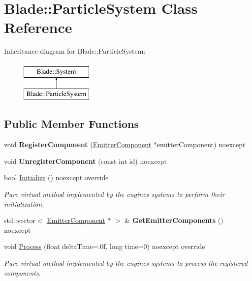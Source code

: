 \hypertarget{class_blade_1_1_particle_system}{}\section{Blade\+:\+:Particle\+System Class Reference}
\label{class_blade_1_1_particle_system}
Inheritance diagram for Blade\+:\+:Particle\+System\+:\begin{figure}[H]
\begin{center}
\leavevmode
\includegraphics[height=2.000000cm]{class_blade_1_1_particle_system}
\end{center}
\end{figure}
\subsection*{Public Member Functions}
\begin{DoxyCompactItemize}
\item 
\mbox{\label{class_blade_1_1_particle_system_a6712a38faa5ef51da4182f6a8de2487b}} 
void {\bfseries Register\+Component} (\hyperlink{class_blade_1_1_emitter_component}{Emitter\+Component} $\ast$emitter\+Component) noexcept
\item 
\mbox{\label{class_blade_1_1_particle_system_a6a12bb122a9a34e6596faaf2e6defa11}} 
void {\bfseries Unregister\+Component} (const int id) noexcept
\item 
bool \hyperlink{class_blade_1_1_particle_system_ae409003e325c44d82a3dcd1794ffb77d}{Initialize} () noexcept override
\begin{DoxyCompactList}\small\item\em Pure virtual method implemented by the engine\textquotesingle{}s systems to perform their initialization. \end{DoxyCompactList}\item 
\mbox{\label{class_blade_1_1_particle_system_ae01bdc68155011d373089700cbe88f52}} 
std\+::vector$<$ \hyperlink{class_blade_1_1_emitter_component}{Emitter\+Component} $\ast$ $>$ \& {\bfseries Get\+Emitter\+Components} () noexcept
\item 
void \hyperlink{class_blade_1_1_particle_system_a01e4983673061d797da072324a98d8d4}{Process} (float delta\+Time=.\+0f, long time=0) noexcept override
\begin{DoxyCompactList}\small\item\em Pure virtual method implemented by the engine\textquotesingle{}s systems to process the registered components. \end{DoxyCompactList}\end{DoxyCompactItemize}


